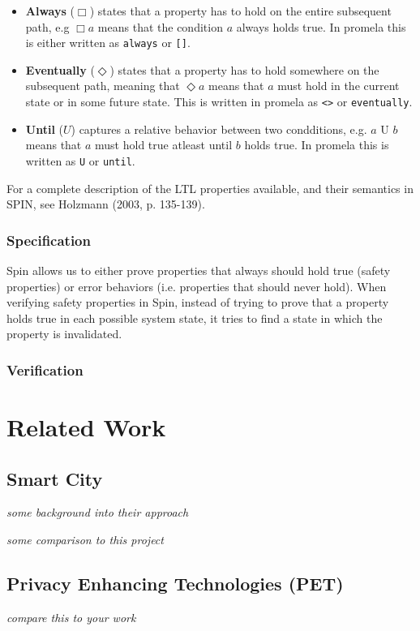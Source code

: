 \begin{itemize}
	\item[] \textbf{Always} ($\Box$) states that a property has to hold on the entire subsequent path, e.g $\Box a$ means that the condition $a$ always holds true. In promela this is either written as \texttt{always} or \texttt{[]}.
	\item[] \textbf{Eventually} ($\Diamond$) states that a property has to hold somewhere on the subsequent path, meaning that $\Diamond a$ means that $a$ must hold in the current state or in some future state. This is written in promela as \texttt{<>} or \texttt{eventually}.
	\item[] \textbf{Until} ($U$) captures a relative behavior between two condditions, e.g. $a \text{ U } b$ means that $a$ must hold true atleast until $b$ holds true. In promela this is written as \texttt{U} or \texttt{until}.
 \end{itemize}

For a complete description of the LTL properties available, and their semantics in SPIN, see Holzmann (2003, p. 135-139).

\subsubsection{Specification}

Spin allows us to either prove properties that always should hold true (safety properties) or error behaviors (i.e. properties that should never hold). When verifying safety properties in Spin, instead of trying to prove that a property holds true in each possible system state, it tries to find a state in which the property is invalidated. 


\subsubsection{Verification}




\section{Related Work}
\subsection{Smart City} 

\textit{some background into their approach}\cite{li2016privacy}

\textit{some comparison to this project}


\subsection{Privacy Enhancing Technologies (PET)}
\label{section:SmartCity}

\textit{compare this to your work}
